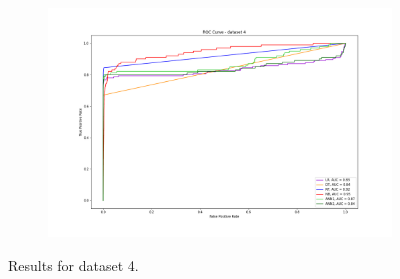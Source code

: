 \documentclass{Configuration_Files/PoliMi3i_thesis}
\begin{document}
\begin{figure}[H]
\begin{subfigure}
    \centering
    \includegraphics[scale=0.3]{Images/ROC_4.png}
\end{subfigure}
  \caption{Results for dataset 4.}
\end{figure}
\end{document}
